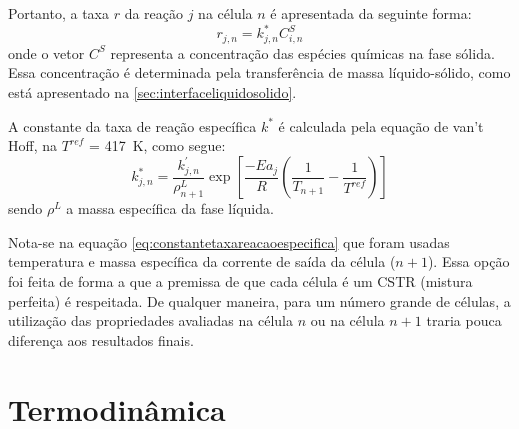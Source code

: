 Portanto, a taxa $r$ da reação $j$ na célula $n$ é apresentada da seguinte
forma:
\begin{equation}
r_{j,n} = k^{*}_{j,n}C^{S}_{i,n}
\label{eq:taxareacao}
\end{equation}
onde o vetor $C^{S}$ representa a concentração das espécies químicas na fase
sólida. Essa concentração é determinada pela transferência de massa
líquido-sólido, como está apresentado na \autoref{sec:interfaceliquidosolido}.

A constante da taxa de reação específica $k^{*}$ é calculada pela
equação de van't Hoff, na $T^{ref}$ = \SI{417}{K}, como segue:
\begin{equation}
k^{*}_{j,n} = \dfrac{k^{'}_{j,n}} {\rho^{L}_{n+1}} \exp
\left[{\dfrac{-Ea_j}{R} \left (\dfrac{1}{T_{n+1}} -
\dfrac{1}{T^{ref}} \right )}\right]
\label{eq:constantetaxareacaoespecifica}
\end{equation}
sendo $\rho^L$ a massa específica da fase líquida.

Nota-se na equação \autoref{eq:constantetaxareacaoespecifica} que foram usadas
temperatura e massa específica da corrente de saída da célula ($n+1$).
Essa opção foi feita de forma a que a premissa de que cada célula
é um CSTR (mistura perfeita) é respeitada.
De qualquer maneira, para um número grande de células, a utilização das propriedades
avaliadas na célula $n$ ou na célula $n+1$ traria pouca diferença aos resultados
finais.


\section{Termodinâmica} \label{sec:termodinamica}

